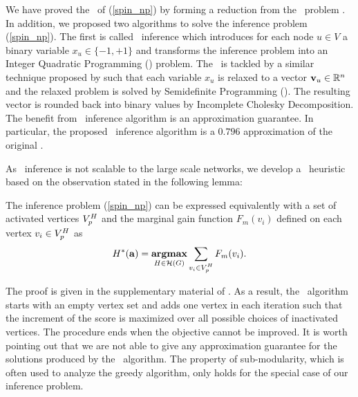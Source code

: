 {We have proved the \nphardness\ of (\ref{spin_np}) by forming a reduction from the \maxcut\ problem \citep{Garey90computers}.
In addition, we proposed two algorithms to solve the inference problem (\ref{spin_np}).
The first is called {\sdp\ inference} which introduces for each node $u\in V$ a binary variable $x_u\in\{-1,+1\}$ and transforms the inference problem into an Integer Quadratic Programming (\iqp) problem.
The \iqp\ is tackled by a similar technique proposed by \citet{Geomans1995improved} such that each variable $x_u$ is relaxed to a vector $\mathbf {v}_u\in\mathbb{R}^n$ and the relaxed problem is solved by Semidefinite Programming (\sdp). 
The resulting vector is rounded back into binary values by Incomplete Cholesky Decomposition.
The benefit from \sdp\ inference algorithm is an approximation guarantee. 
In particular, the proposed \sdp\ inference algorithm is a $0.796$ approximation of the original \iqp.

As \sdp\ inference is not scalable to the large scale networks, we develop a \greedy\ heuristic based on the observation stated in the following lemma:
\begin{lemma}
	The inference problem (\ref{spin_np}) can be expressed equivalently with a set of activated vertices $V^H_{\sc p}$ and the marginal gain function $F_m(v_i)$ defined on each vertex $v_i\in V^H_{\sc p}$ as
	\begin{align*}
		H^{*}(\mathbf {a}) = \underset{{H \in {\cal H}(G)}}{\textbf{argmax}} \sum_{ \substack{v_i\in V^H_{\sc p}}}F_m(v_i).
	\end{align*}
\end{lemma}
\noindent
The proof is given in the supplementary material of . 
As a result, the \greedy\ algorithm starts with an empty vertex set and adds one vertex in each iteration such that the increment of the score is maximized over all possible choices of inactivated vertices.
The procedure ends when the objective cannot be improved.  
It is worth pointing out that we are not able to give any approximation guarantee for the solutions produced by the \greedy\ algorithm.
The property of sub-modularity, which is often used to analyze the greedy algorithm, only holds for the special case of our inference problem.


}
